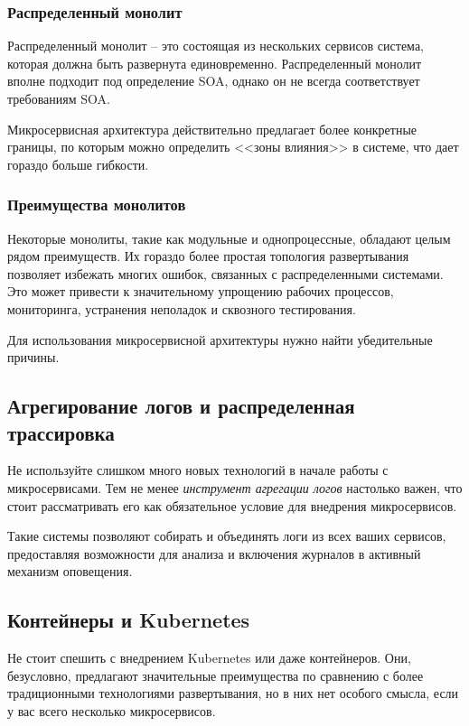 \documentclass[%
	11pt,
	a4paper,
	utf8,
		]{article}
\begin{document}
\subsubsection{Распределенный монолит}

Распределенный монолит -- это состоящая из нескольких сервисов система, которая должна быть развернута единовременно. Распределенный монолит вполне подходит под определение SOA, однако он не всегда соответствует требованиям SOA.

Микросервисная архитектура действительно предлагает более конкретные границы, по которым можно определить <<зоны влияния>> в системе, что дает гораздо больше гибкости.

\subsubsection{Преимущества монолитов}

Некоторые монолиты, такие как модульные и однопроцессные, обладают целым рядом преимуществ. Их гораздо более простая топология развертывания позволяет избежать многих ошибок, связанных с распределенными системами. Это может привести к значительному упрощению рабочих процессов, мониторинга, устранения неполадок и сквозного тестирования.

Для использования микросервисной архитектуры нужно найти убедительные причины.

\subsection{Агрегирование логов и распределенная трассировка}

Не используйте слишком много новых технологий в начале работы с микросервисами. Тем не менее \emph{инструмент агрегации логов} настолько важен, что стоит рассматривать его как обязательное условие для внедрения микросервисов.

Такие системы позволяют собирать и объединять логи из всех ваших сервисов, предоставляя возможности для анализа и включения журналов в активный механизм оповещения. 

\subsection{Контейнеры и Kubernetes}

Не стоит спешить с внедрением Kubernetes или даже контейнеров. Они, безусловно, предлагают значительные преимущества по сравнению с более традиционными технологиями развертывания, но в них нет особого смысла, если у вас всего несколько микросервисов.
\end{document}

